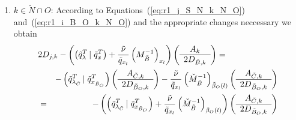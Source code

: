 \documentclass[a4paper]{article}
\begin{document}
\begin{enumerate}
\item $k \in \tilde{N} \cap O$:
According to Equations~(\ref{eq:r1_j_S_N_k_N_O})
and~(\ref{eq:r1_i_B_O_k_N_O}) and the appropriate changes neccessary we obtain
\begin{eqnarray}
\lefteqn{
2D_{j,k}-\left(
          \left(\tilde{q}_{\lambda}^{T}\left|\right. \tilde{q}_{x}^{T}\right)
	  +\frac{\tilde{\nu}}{\tilde{q}_{x_{l}}}
	  \left(M_{\tilde{B}}^{-1}\right)_{x_{l}}
	\right)
\left(\begin{array}{c}
        A_{k} \\
	\hline
	2D_{\tilde{B},k}
      \end{array}
\right)
=}
\nonumber \\
&&
-\left(\tilde{q}_{\lambda_{\tilde{C}}}^{T}\left|\right.
 \tilde{q}_{x_{\tilde{B}_{O}}}^{T}\right)
\left(\begin{array}{c}
        A_{\tilde{C},k} \\
	\hline
	2D_{\tilde{B}_{O},k}
      \end{array}
\right)
-\frac{\tilde{\nu}}{\tilde{q}_{x_{l}}}
\left(\check{M}_{\tilde{B}}^{-1}\right)_{\tilde{\beta}_{O}(l)}
\left(\begin{array}{c}
        A_{\tilde{C}, k} \\
	\hline
	2D_{\tilde{B}_{O}, k}
      \end{array}
\right)
\nonumber \\
&=&
-\left(
 \left(\tilde{q}_{\lambda_{\tilde{C}}}^{T}\left|\right.
  \tilde{q}_{x_{\tilde{B}_{O}}}^{T}\right)
+\frac{\tilde{\nu}}{\tilde{q}_{x_{l}}}
\left(\check{M}_{\tilde{B}}^{-1}\right)_{\tilde{\beta}_{O}(l)}
\right)
\left(\begin{array}{c}
        A_{\tilde{C}, k} \\
	\hline
	2D_{\tilde{B}_{O}, k}
      \end{array}
\right)
\end{eqnarray}
\end{enumerate}
\end{document}
